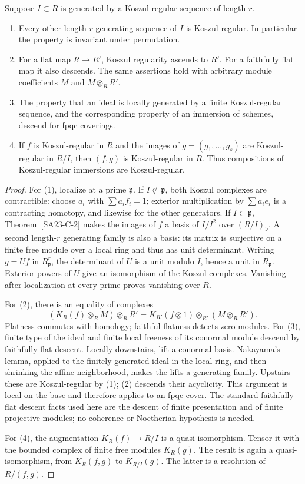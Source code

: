 \begin{theorem}\label{SA23-C-3}
Suppose $I\subset R$ is generated by a Koszul-regular sequence of
length $r$.
\begin{enumerate}
\item Every other length-$r$ generating sequence of $I$ is
Koszul-regular.  In particular the property is invariant under
permutation.
\item For a flat map $R\to R'$, Koszul regularity ascends to $R'$.
For a faithfully flat map it also descends.  The same assertions hold
with arbitrary module coefficients $M$ and $M\otimes_R R'$.
\item The property that an ideal is locally generated by a finite
Koszul-regular sequence, and the corresponding property of an immersion
of schemes, descend for fpqc coverings.
\item If $f$ is Koszul-regular in $R$ and the images of
$g=(g_1,\ldots,g_s)$ are Koszul-regular in $R/I$, then $(f,g)$ is
Koszul-regular in $R$.  Thus compositions of Koszul-regular immersions
are Koszul-regular.
\end{enumerate}
\end{theorem}
\begin{proof}
For (1), localize at a prime $\mathfrak p$.  If $I\not\subset\mathfrak p$,
both Koszul complexes are contractible: choose $a_i$ with
$\sum a_i f_i=1$; exterior multiplication by $\sum a_i e_i$ is a
contracting homotopy, and likewise for the other generators.  If
$I\subset\mathfrak p$, Theorem~\ref{SA23-C-2} makes the images of
$f$ a basis of $I/I^2$ over $(R/I)_\mathfrak p$.  A second length-$r$
generating family is also a basis: its matrix is surjective on a
finite free module over a local ring and thus has unit determinant.
Writing $g=Uf$ in $R_\mathfrak p^r$, the determinant of $U$ is a
unit modulo $I$, hence a unit in $R_\mathfrak p$.  Exterior powers of
$U$ give an isomorphism of the Koszul complexes.  Vanishing after
localization at every prime proves vanishing over $R$.

For (2), there is an equality of complexes
\[
 (K_R(f)\otimes_R M)\otimes_R R'
 =K_{R'}(f\otimes1)\otimes_{R'}(M\otimes_R R').
\]
Flatness commutes with homology; faithful flatness detects zero modules.
For (3), finite type of the ideal and finite local freeness of its
conormal module descend by faithfully flat descent.  Locally downstairs,
lift a conormal basis.  Nakayama's lemma, applied to the finitely
generated ideal in the local ring, and then shrinking the affine
neighborhood, makes the lifts a generating family.  Upstairs these are
Koszul-regular by (1); (2) descends their acyclicity.  This argument is
local on the base and therefore applies to an fpqc cover.  The standard
faithfully flat descent facts used here are the descent of finite
presentation and of finite projective modules; no coherence or
Noetherian hypothesis is needed.

For (4), the augmentation $K_R(f)\to R/I$ is a quasi-isomorphism.
Tensor it with the bounded complex of finite free modules $K_R(g)$.
The result is again a quasi-isomorphism, from $K_R(f,g)$ to
$K_{R/I}(\overline g)$.  The latter is a resolution of $R/(f,g)$.
\end{proof}


